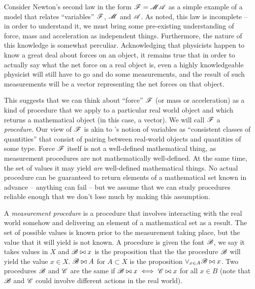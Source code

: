 Consider Newton's second law in the form $\mathscr{F}=\mathscr{MA}$ as a simple example of a model that relates ``variables'' $\mathscr{F}$, $\mathscr{M}$ and $\mathscr{A}$. As \citet{feynman_feynman_1979} noted, this law is incomplete -- in order to understand it, we must bring some pre-existing understanding of force, mass and acceleration as independent things. Furthermore, the nature of this knowledge is somewhat perculiar. Acknowledging that physicists happen to know a great deal about forces on an object, it remains true that in order to actually say what the net force on a real object is, even a highly knowledgeable physicist will still have to go and do some measurements, and the result of such measurements will be a vector representing the net forces on that object.

This suggests that we can think about ``force'' $\mathscr{F}$ (or mass or acceleration) as a kind of procedure that we apply to a particular real world object and which returns a mathematical object (in this case, a vector). We will call $\mathscr{F}$ a \emph{procedure}. Our view of $\mathscr{F}$ is akin to \citet{menger_random_2003}'s notion of variables as ``consistent classes of quantities'' that consist of pairing between real-world objects and quantities of some type. Force $\mathscr{F}$ itself is not a well-defined mathematical thing, as measurement procedures are not mathematically well-defined. At the same time, the set of values it may yield \emph{are} well-defined mathematical things. No actual procedure can be guaranteed to return elements of a mathematical set known in advance -- anything can fail -- but we assume that we can study procedures reliable enough that we don't lose much by making this assumption.

\begin{definition}
A \emph{measurement procedure} is a procedure that involves interacting with the real world somehow and delivering an element of a mathematical set as a result. The set of possible values is known prior to the measurement taking place, but the value that it will yield is not known. A procedure is given the font $\mathscr{B}$, we say it takes values in $X$ and $\mathscr{B}\bowtie x$ is the proposition that the the procedure $\mathscr{B}$ will yield the value $x\in X$. $\mathscr{B}\bowtie A$ for $A\subset X$ is the proposition $\lor_{x\in A} \mathscr{B}\bowtie x$. Two procedures $\mathscr{B}$ and $\mathscr{C}$ are the same if $\mathscr{B}\bowtie x\iff \mathscr{C}\bowtie x$ for all $x\in B$ (note that $\mathscr{B}$ and $\mathscr{C}$ could involve different actions in the real world).
\end{definition}

